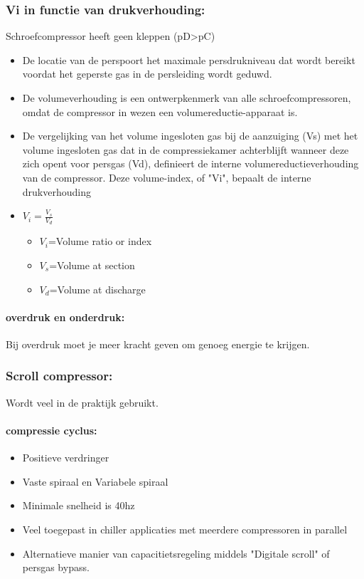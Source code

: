 \documentclass[12pt]{article}
\begin{document}
\subsubsection{Vi in functie van drukverhouding:}
Schroefcompressor heeft geen kleppen (pD>pC)\begin{itemize}
    \item De locatie van de perspoort het maximale persdrukniveau dat wordt bereikt voordat
    het geperste gas in de persleiding wordt geduwd.
    \item De volumeverhouding is een ontwerpkenmerk van alle
    schroefcompressoren, omdat de compressor in wezen een volumereductie-apparaat is.
    \item De vergelijking van het volume ingesloten
    gas bij de aanzuiging (Vs) met het volume
    ingesloten gas dat in de compressiekamer
    achterblijft wanneer deze zich opent voor
    persgas (Vd), definieert de interne
    volumereductieverhouding van de
    compressor. Deze volume-index, of "Vi",
    bepaalt de interne drukverhouding
    \item $V_i=\frac{V_s}{V_d}$\begin{itemize}
        \item $V_i$=Volume ratio or index
        \item $V_s$=Volume at section 
        \item $V_d$=Volume at discharge
    \end{itemize}
\end{itemize}
\paragraph{overdruk en onderdruk:}
Bij overdruk moet je meer kracht geven om genoeg energie te krijgen.
\subsubsection{Scroll compressor:}
Wordt veel in de praktijk gebruikt.
\paragraph{compressie cyclus:}\begin{itemize}
    \item Positieve verdringer 
    \item Vaste spiraal en Variabele spiraal 
    \item Minimale snelheid is 40hz 
    \item Veel toegepast in chiller applicaties met meerdere compressoren in parallel 
    \item Alternatieve manier van capacitietsregeling middels "Digitale scroll" of persgas bypass.
\end{itemize}
\end{document}
